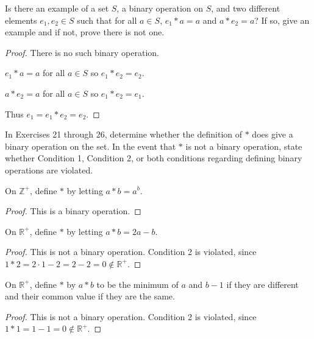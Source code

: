 \begin{exercise}
    Is there an example of a set $S$, a binary operation on $S$, and two different elements $e_{1}, e_{2}\in S$ such that for all $a\in S$, $e_{1} * a = a$ and $a * e_{2} = a$? If so, give an example and if not, prove there is not one.
\end{exercise}

\begin{proof}
    There is no such binary operation.

    $e_{1} * a = a$ for all $a\in S$ so $e_{1} * e_{2} = e_{2}$.

    $a * e_{2} = a$ for all $a\in S$ so $e_{1} * e_{2} = e_{1}$.

    Thus $e_{1} = e_{1} * e_{2} = e_{2}$.
\end{proof}

In Exercises 21 through 26, determine whether the definition of $*$ does give a binary operation on the set. In the event that $*$ is not a binary operation, state whether Condition 1, Condition 2, or both conditions regarding defining binary operations are violated.

\begin{exercise}
    On $\mathbb{Z}^{+}$, define $*$ by letting $a * b = a^{b}$.
\end{exercise}

\begin{proof}
    This is a binary operation.
\end{proof}

\begin{exercise}
    On $\mathbb{R}^{+}$, define $*$ by letting $a * b = 2a - b$.
\end{exercise}

\begin{proof}
    This is not a binary operation. Condition 2 is violated, since $1 * 2 = 2\cdot 1 - 2 = 2 - 2 = 0\notin\mathbb{R}^{+}$.
\end{proof}

\begin{exercise}
    On $\mathbb{R}^{+}$, define $*$ by $a * b$ to be the minimum of $a$ and $b - 1$ if they are different and their common value if they are the same.
\end{exercise}

\begin{proof}
    This is not a binary operation. Condition 2 is violated, since $1 * 1 = 1 - 1 = 0\notin\mathbb{R}^{+}$.
\end{proof}

